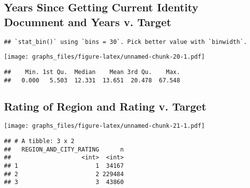 \documentclass[]{article}
\begin{document}
\subsection{Years Since Getting Current Identity Documnent and Years v.
Target}\label{years-since-getting-current-identity-documnent-and-years-v.-target}

\begin{verbatim}
## `stat_bin()` using `bins = 30`. Pick better value with `binwidth`.
\end{verbatim}

\texttt{[image: graphs\_files/figure-latex/unnamed-chunk-20-1.pdf]}

\begin{verbatim}
##    Min. 1st Qu.  Median    Mean 3rd Qu.    Max. 
##   0.000   5.503  12.331  13.651  20.478  67.548
\end{verbatim}

\subsection{Rating of Region and Rating v.
Target}\label{rating-of-region-and-rating-v.-target}

\texttt{[image: graphs\_files/figure-latex/unnamed-chunk-21-1.pdf]}

\begin{verbatim}
## # A tibble: 3 x 2
##   REGION_AND_CITY_RATING      n
##                    <int>  <int>
## 1                      1  34167
## 2                      2 229484
## 3                      3  43860
\end{verbatim}
\end{document}
